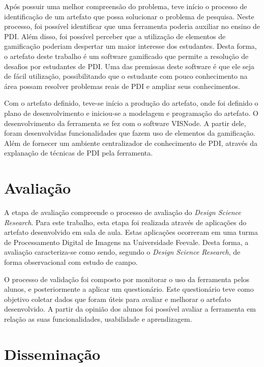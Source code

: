 \documentclass[
	12pt,				%
	oneside,			%
	a4paper,			%
	english,			%
	french,				%
	spanish,			%
	brazil,				%
	]{abntex2}
\begin{document}
Após possuir uma melhor compreensão do problema, teve início o processo de identificação de um artefato que possa solucionar o problema de pesquisa. Neste processo, foi possível identificar que uma ferramenta poderia auxiliar no ensino de PDI. Além disso, foi possível perceber que a utilização de elementos de gamificação poderiam despertar um maior interesse dos estudantes. Desta forma, o artefato deste trabalho é um software gamificado que permite a resolução de desafios por estudantes de PDI. Uma das premissas deste software é que ele seja de fácil utilização, possibilitando que o estudante com pouco conhecimento na área possam resolver problemas reais de PDI e ampliar seus conhecimentos.

Com o artefato definido, teve-se início a produção do artefato, onde foi definido o plano de desenvolvimento e iniciou-se a modelagem e programação do artefato. O desenvolvimento da ferramenta se fez com o software VISNode. A partir dele, foram desenvolvidas funcionalidades que fazem uso de elementos da gamificação. Além de fornecer um ambiente centralizador de conhecimento de PDI, através da explanação de técnicas de PDI pela ferramenta.

\section{Avaliação}

A etapa de avaliação compreende o processo de avaliação do \textit{Design Science Research}. Para este trabalho, esta etapa foi realizada através de aplicações do artefato desenvolvido em sala de aula. Estas aplicações ocorreram em uma turma de Processamento Digital de Imagens na Universidade Feevale. Desta forma, a avaliação caracteriza-se como sendo, segundo o \textit{Design Science Research}, de forma observacional com estudo de campo.

O processo de validação foi composto por monitorar o uso da ferramenta pelos alunos, e posteriormente a aplicar um questionário. Este questionário teve como objetivo coletar dados que foram úteis para avaliar e melhorar o artefato desenvolvido. A partir da opinião dos alunos foi possível avaliar a ferramenta em relação as suas funcionalidades, usabilidade e aprendizagem.

\section{Disseminação}
\end{document}
